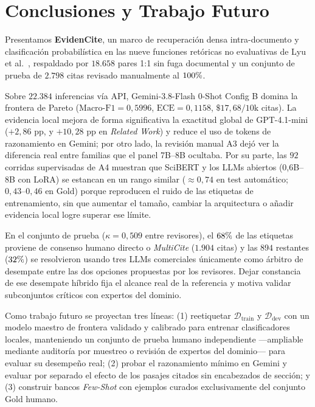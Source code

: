 \documentclass[conference]{IEEEtran}
\newcommand{\pct}{\mbox{\symbol{37}}}
\begin{document}
\section{Conclusiones y Trabajo Futuro}

Presentamos \textbf{EvidenCite}, un marco de recuperación densa intra-documento y clasificación probabilística en las nueve funciones retóricas no evaluativas de Lyu et al.~\cite{lyu2021classification}, respaldado por $18.658$ pares 1:1 sin fuga documental y un conjunto de prueba de $2.798$ citas revisado manualmente al $100\pct{}$.

Sobre $22.384$ inferencias vía API, Gemini-3.8-Flash 0-Shot Config B domina la frontera de Pareto ($\text{Macro-F1}=0,5996$, $\text{ECE}=0,1158$, $\$17,68/10\text{k}$ citas). La evidencia local mejora de forma significativa la exactitud global de GPT-4.1-mini ($+2,86\text{ pp}$, y $+10,28\text{ pp}$ en \textit{Related Work}) y reduce el uso de tokens de razonamiento en Gemini; por otro lado, la revisión manual A3 dejó ver la diferencia real entre familias que el panel 7B--8B ocultaba. Por su parte, las $92$ corridas supervisadas de A4 muestran que SciBERT y los LLMs abiertos (0,6B--8B con LoRA) se estancan en un rango similar ($\approx 0,74$ en test automático; $0,43\text{--}0,46$ en Gold) porque reproducen el ruido de las etiquetas de entrenamiento, sin que aumentar el tamaño, cambiar la arquitectura o añadir evidencia local logre superar ese límite.

En el conjunto de prueba ($\kappa=0,509$ entre revisores), el $68\pct{}$ de las etiquetas proviene de consenso humano directo o \textit{MultiCite} ($1.904$ citas) y las $894$ restantes ($32\pct{}$) se resolvieron usando tres LLMs comerciales únicamente como árbitro de desempate entre las dos opciones propuestas por los revisores. Dejar constancia de ese desempate híbrido fija el alcance real de la referencia y motiva validar subconjuntos críticos con expertos del dominio.

Como trabajo futuro se proyectan tres líneas: (1) reetiquetar $\mathcal{D}_{\text{train}}$ y $\mathcal{D}_{\text{dev}}$ con un modelo maestro de frontera validado y calibrado para entrenar clasificadores locales, manteniendo un conjunto de prueba humano independiente ---ampliable mediante auditoría por muestreo o revisión de expertos del dominio--- para evaluar su desempeño real; (2) probar el razonamiento mínimo en Gemini y evaluar por separado el efecto de los pasajes citados sin encabezados de sección; y (3) construir bancos \textit{Few-Shot} con ejemplos curados exclusivamente del conjunto Gold humano.
\end{document}
